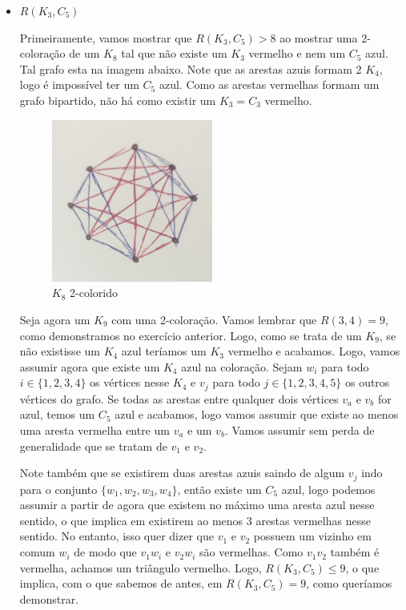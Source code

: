 \documentclass{article}
\begin{document}
\begin{itemize}
\begin{itemize}
			\item \(R(K_3, C_5)\)

				Primeiramente, vamos mostrar que \(R(K_3, C_5) > 8\) ao mostrar uma 2-coloração de um \(K_8\) tal que não existe um
				\(K_3\) vermelho e nem um \(C_5\) azul. Tal grafo esta na imagem abaixo. Note que as arestas azuis formam 2 \(K_4\), logo é impossível
				ter um \(C_5\) azul. Como as arestas vermelhas formam um grafo bipartido, não há como existir um \(K_3 = C_3\) vermelho.

			                  \begin{figure}[H]
				                  \centering
				                  \includegraphics[width=0.5\textwidth]{images/k8.jpeg}
								  \caption{\(K_8\) 2-colorido}
			                  \end{figure}

				Seja agora um \(K_9\) com uma 2-coloração. Vamos lembrar que \(R(3, 4) = 9\), como demonstramos no exercício anterior. Logo, como se trata
			de um \(K_9\), se não existisse um \(K_4\) azul teríamos um \(K_3\) vermelho e acabamos. Logo, vamos assumir agora que existe um \(K_4\) azul na coloração.
				Sejam \(w_i\) para todo \(i \in \{1, 2, 3, 4\}\) os vértices nesse \(K_4\) e \(v_j\) para todo \(j \in \{1, 2, 3, 4, 5\}\) os outros vértices
				do grafo. Se todas as arestas entre qualquer dois vértices \(v_a\) e \(v_b\) for azul, temos um \(C_5\) azul e acabamos, logo vamos assumir que existe ao menos uma aresta vermelha
				entre um \(v_a\) e um \(v_b\). Vamos assumir sem perda de generalidade que se tratam de \(v_1\) e \(v_2\).

				Note também que se existirem duas arestas azuis saindo de algum \(v_j\) indo para o conjunto \(\{w_1, w_2, w_3, w_4\}\), então existe um \(C_5\) azul,
				logo podemos assumir a partir de agora que existem no máximo uma aresta azul nesse sentido, o que implica em existirem ao menos 3 arestas vermelhas nesse sentido. No entanto,
				isso quer dizer que \(v_1\) e \(v_2\) possuem um vizinho em comum \(w_i\) de modo que \(v_1w_i\) e \(v_2w_i\) são vermelhas. Como \(v_1v_2\) também é vermelha,
				achamos um triângulo vermelho. Logo, \(R(K_3, C_5) \leq 9\), o que implica, com o que sabemos de antes, em \(R(K_3, C_5) = 9\), como queríamos demonstrar.


\end{itemize}
\end{itemize}
\end{document}
